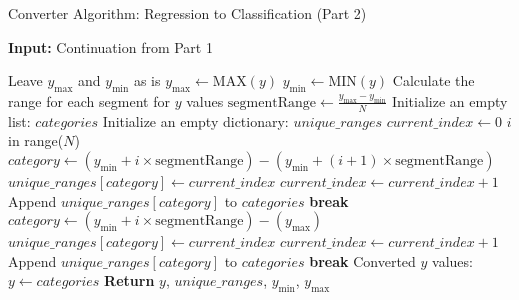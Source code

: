 \documentclass[a4paper, 12pt]{report}
\begin{document}
\begin{algorithm}[H]
    \caption{Converter Algorithm: Regression to Classification (Part 2)}
    \label{alg:LingerImplicitRegressor_regression_values_to_classification_values_part_2}
    \textbf{Input:} Continuation from Part 1
    \begin{algorithmic}[1]
            \State Leave $y_{\text{max}}$ and $y_{\text{min}}$ as is
        \Else
            \State $y_{\text{max}} \gets \text{MAX}(y)$
            \State $y_{\text{min}} \gets \text{MIN}(y)$
        \EndIf
        \State Calculate the range for each segment for $y$ values
        \State $\text{segmentRange} \gets \frac{y_{\text{max}} - y_{\text{min}}}{N}$
        \State Initialize an empty list: $categories$
        \State Initialize an empty dictionary: $unique\_ranges$
        \State $current\_index \gets 0$
            \For $i$ in range($N$) 
                        \State $category \gets (y_{\text{min}} + i \times \text{segmentRange}) - (y_{\text{min}} + (i + 1) \times \text{segmentRange})$
                            \State $unique\_ranges[category] \gets current\_index$
                            \State $current\_index \gets current\_index + 1$
                        \EndIf
                        \State Append $unique\_ranges[category]$ to $categories$
                        \State \textbf{break}
                    \EndIf
                \Else
                        \State $category \gets (y_{\text{min}} + i \times \text{segmentRange}) - (y_{\text{max}})$
                            \State $unique\_ranges[category] \gets current\_index$
                            \State $current\_index \gets current\_index + 1$
                        \EndIf
                    \State Append $unique\_ranges[category]$ to $categories$
                    \State \textbf{break}
                \EndIf
            \EndIf
        \EndFor
    \EndFor 
    \State Converted $y$ values: $y \gets categories$
    \State \textbf{Return} $y$, $unique\_ranges$, $y_{\text{min}}$, $y_{\text{max}}$
    \end{algorithmic}
\end{algorithm}
\clearpage
\end{document}
